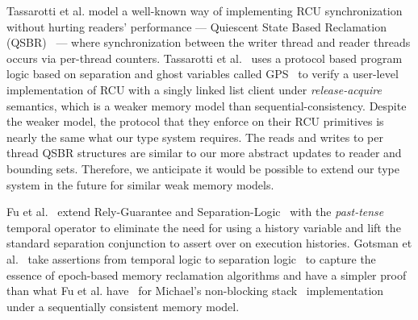 Tassarotti et al. model a well-known way of implementing RCU synchronization without hurting readers' performance --- \textsf{Quiescent State Based Reclamation} (QSBR)~\cite{urcu_ieee} --- where synchronization between the writer thread and reader threads occurs via per-thread counters. Tassarotti et al.~\cite{verrcu} uses a protocol based program logic based on separation and ghost variables called \textsf{GPS}~\cite{Turon:2014:GNW:2660193.2660243} to verify a user-level implementation of \textsf{RCU} with a singly linked list client under \emph{release-acquire} semantics, which is a weaker memory model than sequential-consistency. Despite the weaker model, the protocol that they enforce on their RCU primitives is nearly the same what our type system requires. The reads and writes to per thread QSBR structures are similar to our more abstract updates to reader and bounding sets. Therefore, we anticipate it would be possible to extend our type system in the future for similar weak memory models.%

 Fu et al.~\cite{shao_temp} extend Rely-Guarantee and Separation-Logic~\cite{vafeiadis07,Feng:2007:RCS:1762174.1762193,Feng:2009:LRR:1480881.1480922} with the \textit{past-tense} temporal operator to eliminate the need for using a history variable and lift the standard separation conjunction to assert over on execution histories. Gotsman et al.~\cite{Gotsman:2013:VCM:2450268.2450289} take assertions from temporal logic to separation logic~\cite{vafeiadis07} to capture the essence of epoch-based memory reclamation algorithms and have a simpler proof than what Fu et al. have~\cite{shao_temp} for Michael's non-blocking stack~\cite{Michael:2004:HPS:987524.987595} implementation under a sequentially consistent memory model.

